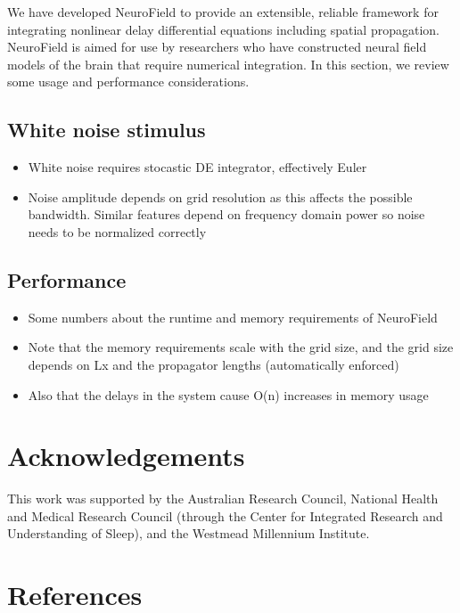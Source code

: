 \documentclass[preprint,review,10pt,authoryear,letterpaper]{elsarticle}
\begin{document}
We have developed NeuroField to provide an extensible, reliable framework for integrating nonlinear delay differential equations including spatial propagation. NeuroField is aimed for use by researchers who have constructed neural field models of the brain that require numerical integration. In this section, we review some usage and performance considerations.

\subsection{White noise stimulus}
\begin{itemize}
	\item White noise requires stocastic DE integrator, effectively Euler
	\item Noise amplitude depends on grid resolution as this affects the possible bandwidth. Similar features depend on frequency domain power so noise needs to be normalized correctly
\end{itemize}

\subsection{Performance}

\begin{itemize}
\item Some numbers about the runtime and memory requirements of NeuroField
\item Note that the memory requirements scale with the grid size, and the grid size depends on Lx and the propagator lengths (automatically enforced)
\item Also that the delays in the system cause O(n) increases in memory usage
\end{itemize}


\section{Acknowledgements}
\label{sec:acknowledgements}
This work was supported by the Australian Research Council, National Health and Medical Research Council (through the Center for Integrated Research and Understanding of Sleep), and the Westmead Millennium Institute.

\section{References}


\end{document}
